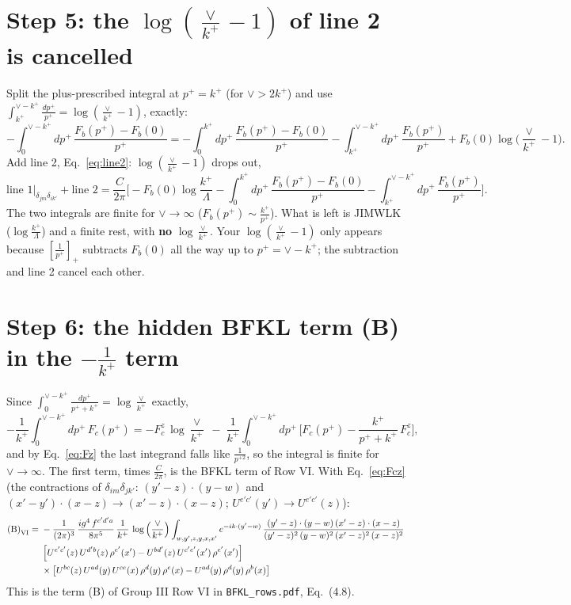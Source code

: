 \documentclass[10pt]{article}
\numberwithin{equation}{section}
\begin{document}
\section{Step 5: the \texorpdfstring{$\log(\frac{\vee}{k^+}-1)$}{log(vee/k+ - 1)} of line 2 is cancelled}
Split the plus-prescribed integral at $p^+=k^+$ (for $\vee>2k^+$) and use $\int_{k^+}^{\vee-k^+}\frac{dp^+}{p^+}=\log(\frac{\vee}{k^+}-1)$, exactly:
\begin{equation}
-\int_0^{\vee-k^+}dp^+\,\frac{F_b(p^+)-F_b(0)}{p^+}
=-\int_0^{k^+}dp^+\,\frac{F_b(p^+)-F_b(0)}{p^+}-\int_{k^+}^{\vee-k^+}dp^+\,\frac{F_b(p^+)}{p^+}+F_b(0)\log\Big(\frac{\vee}{k^+}-1\Big).
\end{equation}
Add line 2, Eq.~\eqref{eq:line2}: $\log(\frac{\vee}{k^+}-1)$ drops out,
\begin{equation}
\text{line 1}\big|_{\delta_{jm}\delta_{ik'}}+\text{line 2}=\frac{C}{2\pi}\bigg[-F_b(0)\log\frac{k^+}{\Lambda}-\int_0^{k^+}dp^+\,\frac{F_b(p^+)-F_b(0)}{p^+}-\int_{k^+}^{\vee-k^+}dp^+\,\frac{F_b(p^+)}{p^+}\bigg].
\label{eq:bcancel}
\end{equation}
The two integrals are finite for $\vee\to\infty$ ($F_b(p^+)\sim\frac{k^+}{p^+}$). What is left is JIMWLK ($\log\frac{k^+}{\Lambda}$) and a finite rest, with \textbf{no} $\log\frac{\vee}{k^+}$. Your $\log(\frac{\vee}{k^+}-1)$ only appears because $\left[\frac{1}{p^+}\right]_+$ subtracts $F_b(0)$ all the way up to $p^+=\vee-k^+$; the subtraction and line 2 cancel each other.

\section{Step 6: the hidden BFKL term (B) in the \texorpdfstring{$-\frac{1}{k^+}$}{-1/k+} term}
Since $\int_0^{\vee-k^+}\frac{dp^+}{p^++k^+}=\log\frac{\vee}{k^+}$ exactly,
\begin{equation}
-\frac{1}{k^+}\int_0^{\vee-k^+}dp^+\,F_c(p^+)=-F_c^z\,\log\frac{\vee}{k^+}\;-\;\frac{1}{k^+}\int_0^{\vee-k^+}dp^+\,\Big[F_c(p^+)-\frac{k^+}{p^++k^+}\,F_c^z\Big],
\label{eq:csplit}
\end{equation}
and by Eq.~\eqref{eq:Fz} the last integrand falls like $\frac{1}{p^{+2}}$, so the integral is finite for $\vee\to\infty$. The first term, times $\frac{C}{2\pi}$, is the BFKL term of Row VI. With Eq.~\eqref{eq:Fcz} (the contractions of $\delta_{im}\delta_{jk'}$: $(y'-z)\cdot(y-w)$ and $(x'-y')\cdot(x-z)\to(x'-z)\cdot(x-z)$; $U^{e'c'}(y')\to U^{e'c'}(z)$):
\begin{align}
\text{(B)}_{\rm VI}={}&-\frac{1}{(2\pi)^{3}}\, \frac{ig^{4}\,f^{c'd'a}}{8\pi^{5}}\, \frac{1}{k^{+}}\,\log{\left(\frac{\vee}{k^{+}}\right)}\int_{w,y',z,y,x,x'} e^{-ik\cdot (y'-w)}\,\frac{(y'-z)\cdot (y-w)\,(x'-z)\cdot (x-z)}{(y'-z)^{2}\,(y-w)^{2}\,(x'-z)^{2}\,(x-z)^{2}}\notag \\
& \left[U^{e'c'}(z)\,U^{d'b}(z)\,\rho^{e'}(x')-U^{bd'}(z)\,U^{c'e'}(x')\,\rho^{e'}(x')\right]\notag \\
& \times\left[U^{bc}(z)\,U^{ad}(y)\,U^{ce}(x)\,\rho^{d}(y)\,\rho^{e}(x)-U^{ad}(y)\,\rho^{d}(y)\,\rho^{b}(x)\right] \label{eq:BVI}
\end{align}
This is the term (B) of Group III Row VI in \texttt{BFKL\_rows.pdf}, Eq.~(4.8).
\end{document}
